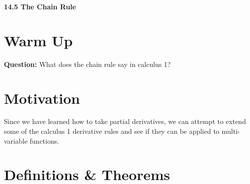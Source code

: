 \documentclass[11pt]{article}
\newcommand{\vs}{\vspace*{.1in}}
\begin{document}
\begin{LARGE}\begin{center}\bf 14.5 The Chain Rule\end{center}
\end{LARGE}

\vs\vs



\section{Warm Up}
\textbf{Question:} What does the chain rule say in calculus 1?


\section{Motivation}
Since we have learned how to take partial derivatives, we can attempt to extend some of the calculus 1 derivative rules and see if they can be applied to multi-variable functions.


\section{Definitions \& Theorems}
\end{document}
